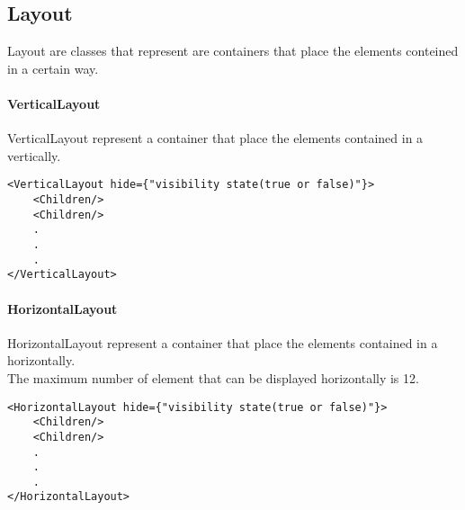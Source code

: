 \subsection{Layout}

Layout are classes that represent are containers that place the elements conteined in a certain way.

\paragraph{VerticalLayout}
VerticalLayout represent a container that place the elements contained in a vertically.

\begin{verbatim}
<VerticalLayout hide={"visibility state(true or false)"}>
    <Children/>
    <Children/>
    .
    .
    .
</VerticalLayout>
\end{verbatim}

\paragraph{HorizontalLayout}
HorizontalLayout represent a container that place the elements contained in a horizontally.\\
The maximum number of element that can be displayed horizontally is 12.

\begin{verbatim}
<HorizontalLayout hide={"visibility state(true or false)"}>
    <Children/>
    <Children/>
    .
    .
    .
</HorizontalLayout>
\end{verbatim}
